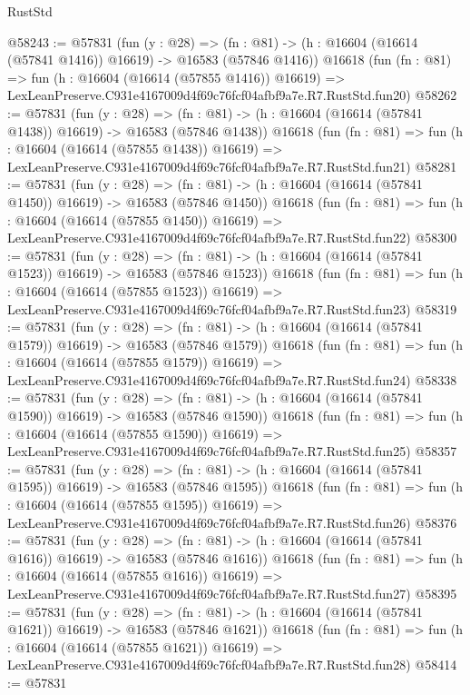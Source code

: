 \begin{lexlean}{RustStd}
\begin{coremodule}
@58243 := @57831
    (fun (y : @28) =>
    (fn : @81) -> (h : @16604 (@16614 (@57841 @1416)) @16619) -> @16583 (@57846 @1416))
    @16618
    (fun (fn : @81) =>
    fun (h : @16604 (@16614 (@57855 @1416)) @16619) =>
    LexLeanPreserve.C931e4167009d4f69c76fcf04afbf9a7e.R7.RustStd.fun20)
@58262 := @57831
    (fun (y : @28) =>
    (fn : @81) -> (h : @16604 (@16614 (@57841 @1438)) @16619) -> @16583 (@57846 @1438))
    @16618
    (fun (fn : @81) =>
    fun (h : @16604 (@16614 (@57855 @1438)) @16619) =>
    LexLeanPreserve.C931e4167009d4f69c76fcf04afbf9a7e.R7.RustStd.fun21)
@58281 := @57831
    (fun (y : @28) =>
    (fn : @81) -> (h : @16604 (@16614 (@57841 @1450)) @16619) -> @16583 (@57846 @1450))
    @16618
    (fun (fn : @81) =>
    fun (h : @16604 (@16614 (@57855 @1450)) @16619) =>
    LexLeanPreserve.C931e4167009d4f69c76fcf04afbf9a7e.R7.RustStd.fun22)
@58300 := @57831
    (fun (y : @28) =>
    (fn : @81) -> (h : @16604 (@16614 (@57841 @1523)) @16619) -> @16583 (@57846 @1523))
    @16618
    (fun (fn : @81) =>
    fun (h : @16604 (@16614 (@57855 @1523)) @16619) =>
    LexLeanPreserve.C931e4167009d4f69c76fcf04afbf9a7e.R7.RustStd.fun23)
@58319 := @57831
    (fun (y : @28) =>
    (fn : @81) -> (h : @16604 (@16614 (@57841 @1579)) @16619) -> @16583 (@57846 @1579))
    @16618
    (fun (fn : @81) =>
    fun (h : @16604 (@16614 (@57855 @1579)) @16619) =>
    LexLeanPreserve.C931e4167009d4f69c76fcf04afbf9a7e.R7.RustStd.fun24)
@58338 := @57831
    (fun (y : @28) =>
    (fn : @81) -> (h : @16604 (@16614 (@57841 @1590)) @16619) -> @16583 (@57846 @1590))
    @16618
    (fun (fn : @81) =>
    fun (h : @16604 (@16614 (@57855 @1590)) @16619) =>
    LexLeanPreserve.C931e4167009d4f69c76fcf04afbf9a7e.R7.RustStd.fun25)
@58357 := @57831
    (fun (y : @28) =>
    (fn : @81) -> (h : @16604 (@16614 (@57841 @1595)) @16619) -> @16583 (@57846 @1595))
    @16618
    (fun (fn : @81) =>
    fun (h : @16604 (@16614 (@57855 @1595)) @16619) =>
    LexLeanPreserve.C931e4167009d4f69c76fcf04afbf9a7e.R7.RustStd.fun26)
@58376 := @57831
    (fun (y : @28) =>
    (fn : @81) -> (h : @16604 (@16614 (@57841 @1616)) @16619) -> @16583 (@57846 @1616))
    @16618
    (fun (fn : @81) =>
    fun (h : @16604 (@16614 (@57855 @1616)) @16619) =>
    LexLeanPreserve.C931e4167009d4f69c76fcf04afbf9a7e.R7.RustStd.fun27)
@58395 := @57831
    (fun (y : @28) =>
    (fn : @81) -> (h : @16604 (@16614 (@57841 @1621)) @16619) -> @16583 (@57846 @1621))
    @16618
    (fun (fn : @81) =>
    fun (h : @16604 (@16614 (@57855 @1621)) @16619) =>
    LexLeanPreserve.C931e4167009d4f69c76fcf04afbf9a7e.R7.RustStd.fun28)
@58414 := @57831

\end{coremodule}
\end{lexlean}
